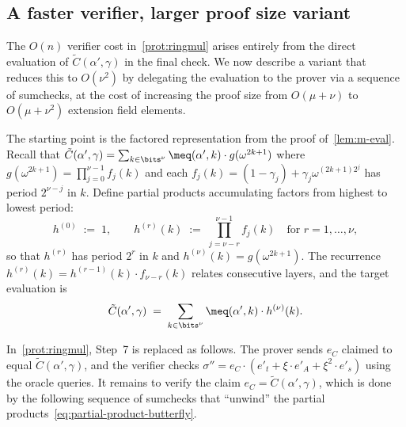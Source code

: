 \subsection{A faster verifier, larger proof size variant}
\label{sec:logger-verifier}

The $O(n)$ verifier cost in~\cref{prot:ringmul} arises entirely from the direct evaluation of $\tilde{C}(\alpha', \gamma)$ in the final check.
We now describe a variant that reduces this to $O(\nu^2)$ by delegating the evaluation to the prover via a sequence of sumchecks, at the cost of increasing the proof size from $O(\mu + \nu)$ to $O(\mu + \nu^2)$ extension field elements.

The starting point is the factored representation from the proof of~\cref{lem:m-eval}.
Recall that $\tilde{C}(\alpha', \gamma) = \sum_{k \in \bits^\nu} \meq(\alpha', k) \cdot g(\omega^{2k+1})$ where $g(\omega^{2k+1}) = \prod_{j=0}^{\nu-1} f_j(k)$ and each $f_j(k) = (1-\gamma_j) + \gamma_j \omega^{(2k+1)2^j}$ has period $2^{\nu-j}$ in $k$.
Define partial products accumulating factors from highest to lowest period:
\begin{equation}\label{eq:partial-product-butterfly}
    h^{(0)} \;:=\; 1, \qquad h^{(r)}(k) \;:=\; \prod_{j=\nu-r}^{\nu-1} f_j(k) \quad \text{for } r = 1, \ldots, \nu,
\end{equation}
so that $h^{(r)}$ has period $2^{r}$ in $k$ and $h^{(\nu)}(k) = g(\omega^{2k+1})$.
The recurrence $h^{(r)}(k) = h^{(r-1)}(k) \cdot f_{\nu-r}(k)$ relates consecutive layers, and the target evaluation is
\begin{equation}\label{eq:target-butterfly}
    \tilde{C}(\alpha', \gamma) \;=\; \sum_{k \in \bits^\nu} \meq(\alpha', k) \cdot h^{(\nu)}(k).
\end{equation}

 In~\cref{prot:ringmul}, Step~7 is replaced as follows.
The prover sends $e_C$ claimed to equal $\tilde{C}(\alpha', \gamma)$, and the verifier checks $\sigma'' = e_C \cdot (e'_t + \xi \cdot e'_A + \xi^2 \cdot e'_s)$ using the oracle queries.
It remains to verify the claim $e_C = \tilde{C}(\alpha', \gamma)$, which is done by the following sequence of sumchecks that ``unwind'' the partial products~\eqref{eq:partial-product-butterfly}.

